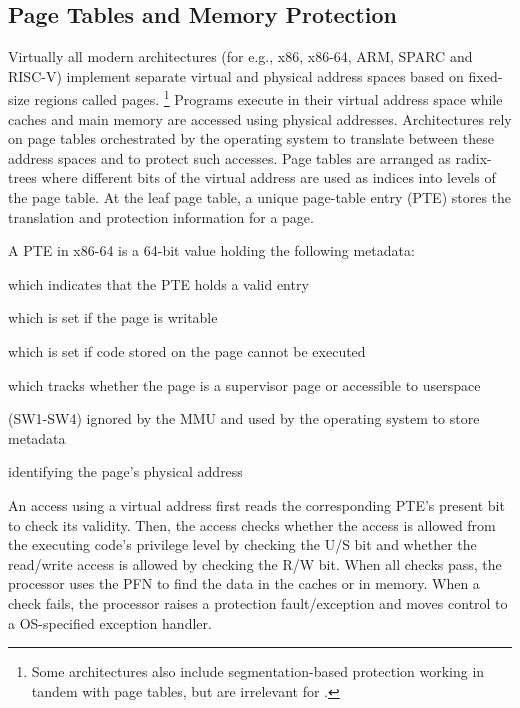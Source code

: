 \documentclass[letterpaper,twocolumn,10pt, anonymous]{article}
\begin{document}
\subsection{Page Tables and Memory Protection}
Virtually all modern architectures (for e.g., x86, x86-64, ARM, SPARC and 
RISC-V) implement separate virtual and physical
address spaces based on fixed-size regions called pages. 
\footnote{Some architectures also include segmentation-based protection 
working in tandem with page tables, but are irrelevant for \tiktok.}
Programs execute in their virtual address space while caches and main memory
are accessed using physical addresses.
Architectures rely on page tables orchestrated by the operating system 
to translate between these address spaces and to protect such accesses.
Page tables are arranged as radix-trees where different bits of the 
virtual address are used as indices into levels of the page table.
At the leaf page table, a unique page-table entry (PTE) stores the 
translation and protection information for a page.

A PTE in x86-64 is a 64-bit value holding the following metadata:
\begin{description}[noitemsep]
  \item[Present bit (P)] which indicates that the PTE holds a valid entry
  \item[Read/Write bit (R/W)] which is set if the page is writable
  \item[Not Executable bit (NX)] which is set if code stored on the page 
        cannot be executed 
  \item[User/Supervisor bit (U/S)] which tracks whether the page is 
        a supervisor page or accessible to userspace
  \item[Software-usable bits] (SW1-SW4) ignored by the MMU and used by the 
        operating system to store metadata
  \item[Page Frame Number (PFN)] identifying the page's physical address
\end{description}

An access using a virtual address first reads the corresponding PTE's 
present bit to check its validity. 
Then, the access checks whether the access is allowed from the executing
code's privilege level by checking the U/S bit and whether the 
read/write access is allowed by checking the R/W bit.
When all checks pass, the processor uses the PFN to find the data in 
the caches or in memory.
When a check fails, the processor raises a protection fault/exception and
moves control to a OS-specified exception handler.
\end{document}
